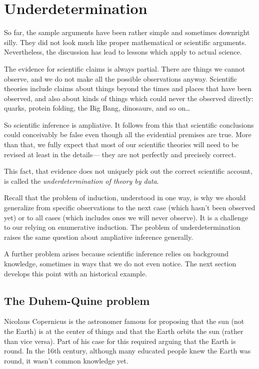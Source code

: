 \documentclass[]{article}
\begin{document}
\section{Underdetermination}

So far, the sample arguments have been rather simple and sometimes downright silly. They did not look much like proper mathematical or scientific arguments. Nevertheless, the discussion has lead to lessons which apply to actual science.

The evidence for scientific claims is always partial. There are things we cannot observe, and we do not make all the possible observations anyway. Scientific theories include claims about things beyond the times and places that have been observed, and also about kinds of things which could never the observed directly: quarks, protein folding, the Big Bang, dinosaurs, and so on\ldots

So scientific inference is ampliative. It follows from this that scientific conclusions could conceivably be false even though all the evidential premises are true. More than that, we fully expect that most of our scientific theories will need to be revised at least in the details--- they are not perfectly and precisely correct.

This fact, that evidence does not uniquely pick out the correct scientific account, is called the \emph{underdetermination of theory by data}.

Recall that the problem of induction, understood in one way, is why we should generalize from specific observations to the next case (which hasn't been observed yet) or to all cases (which includes ones we will never observe). It is a challenge to our relying on enumerative induction. The problem of underdetermination raises the same question about ampliative inference generally.

A further problem arises because scientific inference relies on background knowledge, sometimes in ways that we do not even notice. The next section develops this point with an historical example.

\subsection{The Duhem-Quine problem}

Nicolaus Copernicus is the astronomer famous for proposing that the sun (not the Earth) is at the center of things and that the Earth orbits the sun (rather than vice versa). Part of his case for this required arguing that the Earth is round. In the 16th century, although many educated people knew the Earth was round, it wasn't common knowledge yet.
\end{document}
